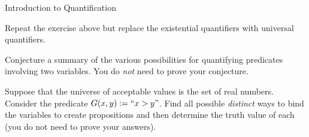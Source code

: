 \begin{section}{Introduction to Quantification}
\begin{exercise}
Repeat the exercise above but replace the existential quantifiers with universal quantifiers.
\end{exercise}

\begin{problem}
Conjecture a summary of the various possibilities for quantifying predicates involving two variables.  You do \emph{not} need to prove your conjecture.
\end{problem}

\begin{exercise}
Suppose that the universe of acceptable values is the set of real numbers.  Consider the predicate $G(x,y):=``x>y"$.  Find all possible \emph{distinct} ways to bind the variables to create propositions and then determine the truth value of each (you do not need to prove your answers).
\end{exercise}

\end{section}